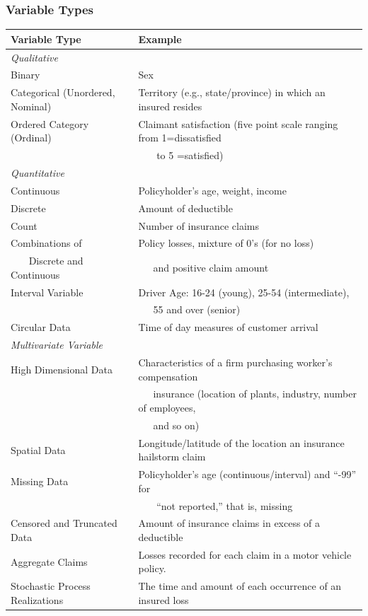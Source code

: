 \documentclass[serif,10pt]{beamer}
\begin{document}
\begin{frame}
\frametitle{Variable Types}
\begin{table}[htp]
  \begin{center}
\begin{tabular}{l|l} \hline
{\bf Variable Type} & {\bf Example} \\\hline
{\it Qualitative} &            \\
    Binary &        Sex \\
Categorical (Unordered, Nominal) & Territory (e.g., state/province) in which an insured resides \\
Ordered Category (Ordinal) & Claimant satisfaction (five point scale ranging from 1=dissatisfied \\
& ~~~ to 5 =satisfied) \\\hline
{\it Quantitative} &            \\
Continuous & Policyholder's age, weight, income \\
  Discrete & Amount of deductible \\
Count & Number of insurance claims \\
Combinations of  & Policy losses, mixture of 0's (for no loss)  \\
~~~ Discrete and Continuous & ~~~and positive claim amount \\
Interval Variable & Driver Age: 16-24 (young), 25-54 (intermediate),  \\
& ~~~55 and over (senior) \\
Circular Data & Time of day measures of customer arrival \\ \hline
{\it Multivariate Variable} &            \\
High Dimensional Data & Characteristics of a firm purchasing worker's compensation \\
& ~~~insurance (location of plants, industry, number of employees, \\
&~~~and so on) \\
Spatial Data & Longitude/latitude of the location an insurance hailstorm claim \\
Missing Data & Policyholder's age (continuous/interval) and ``-99'' for \\
&~~~ ``not reported,'' that is, missing \\
Censored and Truncated Data & Amount of insurance claims in excess of a deductible \\
Aggregate Claims & Losses recorded for each claim in a motor vehicle policy. \\
Stochastic Process Realizations & The time and amount of each occurrence of an insured loss \\ \hline
\end{tabular}\end{center}
\end{table}
\end{frame}
\end{document}
